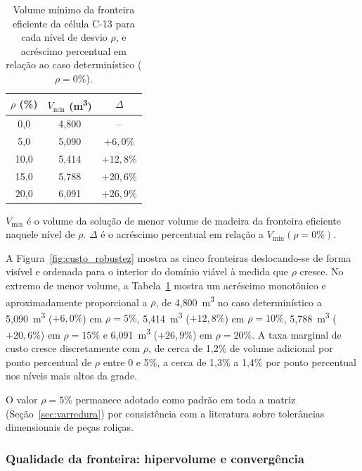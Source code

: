 \begin{table}[!ht]
\caption{Volume mínimo da fronteira eficiente da célula C-13 para cada nível de desvio $\rho$, e acréscimo percentual em relação ao caso determinístico ($\rho = 0\%$).\label{tab:custo_robustez}}
\begin{threeparttable}
\begin{tabular*}{\columnwidth}{@{\extracolsep\fill}ccc@{\extracolsep\fill}}
\toprule
$\rho$ (\%) & $V_{\min}$ (m\textsuperscript{3}) & $\Delta$ \\
\midrule
0{,}0 & 4{,}800 & -- \\
5{,}0 & 5{,}090 & $+6{,}0\%$ \\
10{,}0 & 5{,}414 & $+12{,}8\%$ \\
15{,}0 & 5{,}788 & $+20{,}6\%$ \\
20{,}0 & 6{,}091 & $+26{,}9\%$ \\
\bottomrule
\end{tabular*}
\begin{tablenotes}
\footnotesize
\item $V_{\min}$ é o volume da solução de menor volume de madeira da fronteira eficiente naquele nível de $\rho$. $\Delta$ é o acréscimo percentual em relação a $V_{\min}(\rho{=}0\%)$.
\end{tablenotes}
\end{threeparttable}
\end{table}

A Figura~\ref{fig:custo_robustez} mostra as cinco fronteiras deslocando-se de forma visível e ordenada para o interior do domínio viável à medida que $\rho$ cresce.
No extremo de menor volume, a Tabela~\ref{tab:custo_robustez} mostra um acréscimo monotônico e aproximadamente proporcional a $\rho$, de 4{,}800~m\textsuperscript{3} no caso determinístico a 5{,}090~m\textsuperscript{3} ($+6{,}0\%$) em $\rho = 5\%$, 5{,}414~m\textsuperscript{3} ($+12{,}8\%$) em $\rho = 10\%$, 5{,}788~m\textsuperscript{3} ($+20{,}6\%$) em $\rho = 15\%$ e 6{,}091~m\textsuperscript{3} ($+26{,}9\%$) em $\rho = 20\%$.
A taxa marginal de custo cresce discretamente com $\rho$, de cerca de 1{,}2\% de volume adicional por ponto percentual de $\rho$ entre 0 e 5\%, a cerca de 1{,}3\% a 1{,}4\% por ponto percentual nos níveis mais altos da grade.

O valor $\rho = 5\%$ permanece adotado como padrão em toda a matriz (Seção~\ref{sec:varredura}) por consistência com a literatura sobre tolerâncias dimensionais de peças roliças.

\subsubsection{Qualidade da fronteira: hipervolume e convergência}\label{sec:hipervolume}

